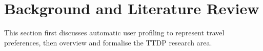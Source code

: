 \section{Background and Literature Review}
\label{Literature}

This section first discusses automatic user profiling to represent travel
preferences, then overview and formalise the TTDP research area.






